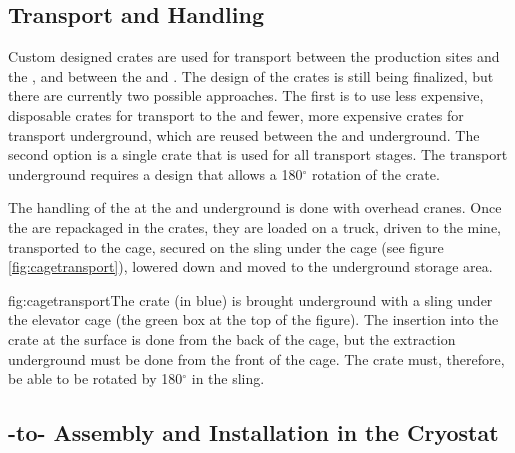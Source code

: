 \subsection{Transport and Handling}
\label{sec:fdsp-apa-install-transport}

Custom designed crates are used for transport between the production sites and the , and between the  and \surf{}. The design of the crates is still being finalized, but there are currently two possible approaches. The first is to use less expensive, disposable crates for transport to the  and fewer, more expensive crates for transport underground, which are reused between the  and underground. The second option is a single crate that is used for all transport stages. The transport underground requires a design that allows a 180$^{\circ}$ rotation of the crate. 


The handling of the  at the  and underground is done with overhead cranes. Once the  are repackaged in the crates, they are loaded on a truck, driven to the mine, transported to the cage, secured on the sling under the cage (see figure \ref{fig:cagetransport}), lowered down and moved to the underground storage area.

\begin{dunefigure}{fig:cagetransport}{The  crate (in blue) is brought underground with a sling under the elevator cage (the green box at the top of the figure). The insertion into the crate at the surface is done from the back of the cage, but the extraction underground must be done from the front of the cage. The  crate must, therefore, be able to be rotated  by 180$^\circ$ in the sling.}
\setlength{\fboxsep}{0pt}
\setlength{\fboxrule}{0.5pt}
\end{dunefigure}


\subsection{-to- Assembly and Installation in the Cryostat}
\label{sec:fdsp-apa-install-cryostat}

